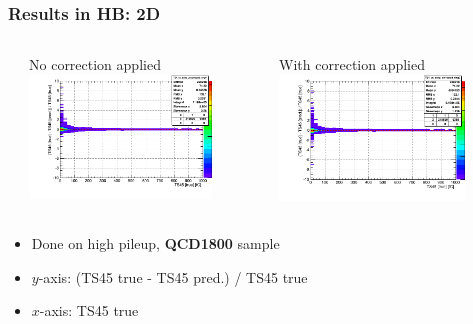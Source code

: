 \documentclass[bigger]{beamer}
\providecommand{\alert}[1]{\textbf{#1}}
\begin{document}
\begin{frame}
\frametitle{Results in HB: 2D}
\label{sec-3-3-2}
\begin{columns} %
\label{sec-3-3-2-1}
\begin{column}{0.55\textwidth}
\label{sec-3-3-2-1-1}

\centering
No correction applied
\includegraphics[width=0.8\textwidth]{fig/delta_uncorrected_QCD1800_ring_0.png}
\end{column}
\begin{column}{0.55\textwidth}
\label{sec-3-3-2-1-2}

\centering
With correction applied
\includegraphics[width=0.8\textwidth]{fig/delta_corrected_QCD1800_ring_0.png}
\end{column}
\end{columns}
\label{sec-3-3-2-2}
\begin{itemize}

\item Done on high pileup, \alert{QCD1800} sample
\label{sec-3-3-2-2-1}%

\item $y$-axis: (TS45 true - TS45 pred.) / TS45 true
\label{sec-3-3-2-2-2}%

\item $x$-axis: TS45 true
\label{sec-3-3-2-2-3}%
\end{itemize} %
\end{frame}
\end{document}

